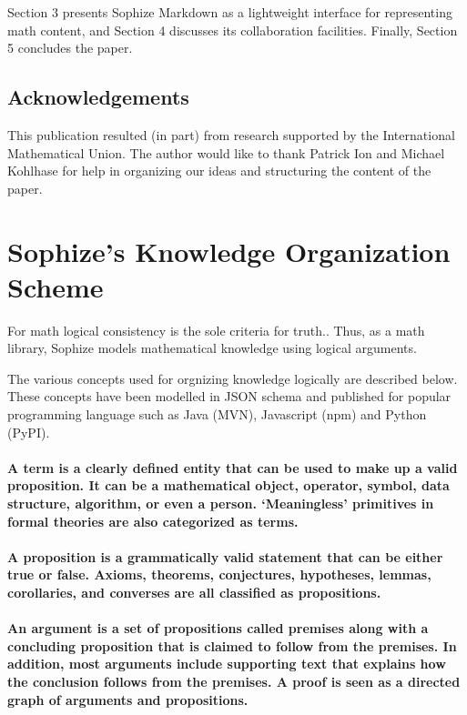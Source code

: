 \documentclass[a4paper]{article}
\begin{document}
Section 3 presents Sophize Markdown as a lightweight interface for representing math content, and Section 4 discusses its collaboration facilities. Finally, Section 5 concludes the paper.


\subsection*{Acknowledgements}
This publication resulted (in part) from research supported by the International Mathematical Union. The author would like to thank Patrick Ion and Michael Kohlhase for help in organizing our ideas and structuring the content of the paper.

\section{Sophize's Knowledge Organization Scheme}
For math logical consistency is the sole criteria for truth..
Thus, as a math library, Sophize models mathematical knowledge using logical arguments. 

The various concepts used for orgnizing knowledge logically are described below. These concepts have been modelled in JSON schema \cite{sophize_datamodel} and published for popular programming language such as Java (MVN), Javascript (npm) and Python (PyPI). 

\paragraph{A \textbf{term} is a clearly defined entity that can be used to make up a valid proposition. It can be a mathematical object, operator, symbol, data structure, algorithm, or even a person. `Meaningless' primitives in formal theories are also categorized as terms.}

\paragraph{A \textbf{proposition} is a grammatically valid statement that can be either true or false. Axioms, theorems, conjectures, hypotheses, lemmas, corollaries, and converses are all classified as propositions.}

\paragraph{An \textbf{argument} is a set of propositions called premises along with a concluding proposition that is claimed to follow from the premises. In addition, most arguments include supporting text that explains how the conclusion follows from the premises. A proof is seen as a directed graph of arguments and propositions.}
\end{document}
